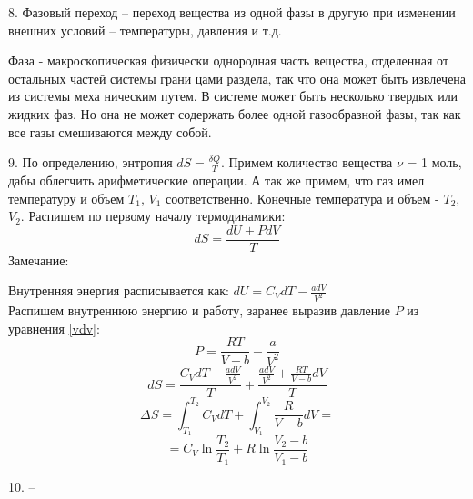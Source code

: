 \documentclass[a4paper,12pt]{article}
\begin{document}
	8. Фазовый переход – переход вещества из одной фазы в другую при изменении внешних условий – температуры, давления и т.д. 
	
	Фаза - макроскопическая физически однородная
	часть вещества, отделенная от остальных частей системы грани
	цами раздела, так что она может быть извлечена из системы меха
	ническим путем. В системе может быть несколько твердых или жидких фаз. Но она не может содержать более одной газообразной фазы, так как все газы смешиваются между собой.
	
	9. По определению, энтропия $dS = \frac{\delta Q}{T}$.
	Примем количество вещества $\nu$ = 1 моль, дабы облегчить арифметические операции. А так же примем, что газ имел температуру и объем $T_1$, $V_1$ соответственно. Конечные температура и объем - $T_2$, $V_2$.
	Распишем по первому началу термодинамики:
	$$dS = \frac{dU + PdV}{T}$$
	Замечание:
	
	Внутренняя энергия расписывается как: $dU = C_VdT - \frac{adV}{V^2}$\\
	
	Распишем внутреннюю энергию и работу, заранее выразив давление $P$ из уравнения \eqref{vdv}:
	$$P = \frac{RT}{V-b} - \frac{a}{V^2}$$
	$$dS = \frac{C_VdT-\frac{adV}{V^2}}{T} + \frac{\frac{adV}{V^2}+\frac{RT}{V-b}dV}{T} $$
	$$\Delta S = \int_{T_1}^{T_2}C_VdT + \int_{V_1}^{V_2}\frac{R}{V-b}dV = $$
	$$ = C_V\ln\frac{T_2}{T_1} + R\ln\frac{V_2-b}{V_1-b}$$
	
	10. --
\end{document}

